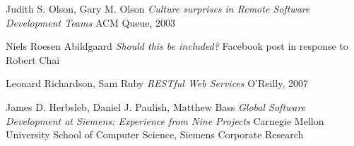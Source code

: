 \begin{thebibliography}{9}

		Judith S. Olson, Gary M. Olson\newline
		\emph{Culture surprises in Remote Software Development Teams}\newline
		ACM Queue, 2003

		Niels Roesen Abildgaard\newline
		\emph{Should this be included?}\newline
		Facebook post in response to Robert Chai

        Leonard Richardson, Sam Ruby\newline
        \emph{RESTful Web Services}
        O'Reilly, 2007
    
		James D. Herbsleb, Daniel J. Paulish, Matthew Bass\newline
		\emph{Global Software Development at Siemens: Experience from Nine Projects}
		Carnegie Mellon University School of Computer Science,
		Siemens Corporate Research 

\end{thebibliography}

